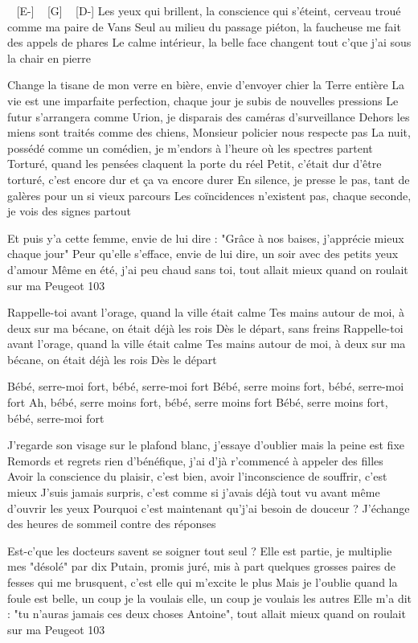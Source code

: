 
\begin{guitar}
[A-] ~ [E-] ~ [G] ~ [D-] 
Les yeux qui brillent, la conscience qui s'éteint, cerveau troué comme ma paire de Vans
Seul au milieu du passage piéton, la faucheuse me fait des appels de phares
Le calme intérieur, la belle face changent tout c'que j'ai sous la chair en pierre

Change la tisane de mon verre en bière, envie d'envoyer chier la Terre entière
La vie est une imparfaite perfection, chaque jour je subis de nouvelles pressions
Le futur s'arrangera comme Urion, je disparais des caméras d'surveillance
Dehors les miens sont traités comme des chiens, Monsieur policier nous respecte pas
La nuit, possédé comme un comédien, je m'endors à l'heure où les spectres partent
Torturé, quand les pensées claquent la porte du réel
Petit, c'était dur d'être torturé, c'est encore dur et ça va encore durer
En silence, je presse le pas, tant de galères pour un si vieux parcours
Les coïncidences n'existent pas, chaque seconde, je vois des signes partout

Et puis y'a cette femme, envie de lui dire : "Grâce à nos baises, j'apprécie mieux chaque jour"
Peur qu'elle s'efface, envie de lui dire, un soir avec des petits yeux d'amour
Même en été, j'ai peu chaud sans toi, tout allait mieux quand on roulait sur ma Peugeot 103

Rappelle-toi avant l'orage, quand la ville était calme
Tes mains autour de moi, à deux sur ma bécane, on était déjà les rois
Dès le départ, sans freins
Rappelle-toi avant l'orage, quand la ville était calme
Tes mains autour de moi, à deux sur ma bécane, on était déjà les rois
Dès le départ


Bébé, serre-moi fort, bébé, serre-moi fort
Bébé, serre moins fort, bébé, serre-moi fort
Ah, bébé, serre moins fort, bébé, serre moins fort
Bébé, serre moins fort, bébé, serre-moi fort

J'regarde son visage sur le plafond blanc, j'essaye d'oublier mais la peine est fixe
Remords et regrets rien d'bénéfique, j'ai d'jà r'commencé à appeler des filles
Avoir la conscience du plaisir, c'est bien, avoir l'inconscience de souffrir, c'est mieux
J'suis jamais surpris, c'est comme si j'avais déjà tout vu avant même d'ouvrir les yeux
Pourquoi c'est maintenant qu'j'ai besoin de douceur ?
J'échange des heures de sommeil contre des réponses

Est-c'que les docteurs savent se soigner tout seul ?
Elle est partie, je multiplie mes "désolé" par dix
Putain, promis juré, mis à part quelques grosses paires de fesses qui me brusquent, c'est elle qui m'excite le plus
Mais je l'oublie quand la foule est belle, un coup je la voulais elle, un coup je voulais les autres
Elle m'a dit : "tu n'auras jamais ces deux choses Antoine", tout allait mieux quand on roulait sur ma Peugeot 103


\end{guitar}
